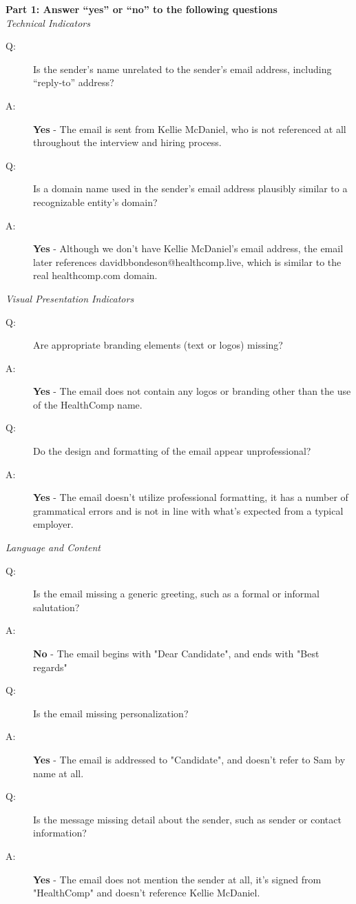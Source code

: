 \begin{fullwidth}
\textbf{Part 1: Answer “yes” or “no” to the following questions}\\\medskip
\textit{Technical Indicators}
    \begin{description}
        \item[Q:] Is the sender’s name unrelated to the sender’s email address, including “reply-to” address?
        \item[A:] \textbf{Yes} - The email is sent from Kellie McDaniel, who is not referenced at all throughout the interview and hiring process.
        \item[Q:] Is a domain name used in the sender's email address plausibly similar to a
recognizable entity's domain?
        \item[A:] \textbf{Yes} - Although we don't have Kellie McDaniel's email address, the email later references davidbbondeson@healthcomp.live, which is similar to the real healthcomp.com domain.
    \end{description}

\textit{Visual Presentation Indicators}
\begin{description}
    \item[Q:] Are appropriate branding elements (text or logos) missing?
    \item[A:] \textbf{Yes} - The email does not contain any logos or branding other than the use of the HealthComp name.
    \item[Q:] Do the design and formatting of the email appear unprofessional?
    \item[A:] \textbf{Yes} - The email doesn't utilize professional formatting, it has a number of grammatical errors and is not in line with what's expected from a typical employer.
\end{description}

\textit{Language and Content}
\begin{description}
    \item[Q:] Is the email missing a generic greeting, such as a formal or informal
salutation?
    \item[A:] \textbf{No} - The email begins with "Dear Candidate", and ends with "Best regards"
    \item[Q:] Is the email missing personalization?
    \item[A:] \textbf{Yes} -  The email is addressed to "Candidate", and doesn't refer to Sam by name at all.
    \item[Q:] Is the message missing detail about the sender, such as sender or contact
information?
    \item[A:] \textbf{Yes} - The email does not mention the sender at all, it's signed from "HealthComp" and doesn't reference Kellie McDaniel.
\end{description}


\end{fullwidth}
